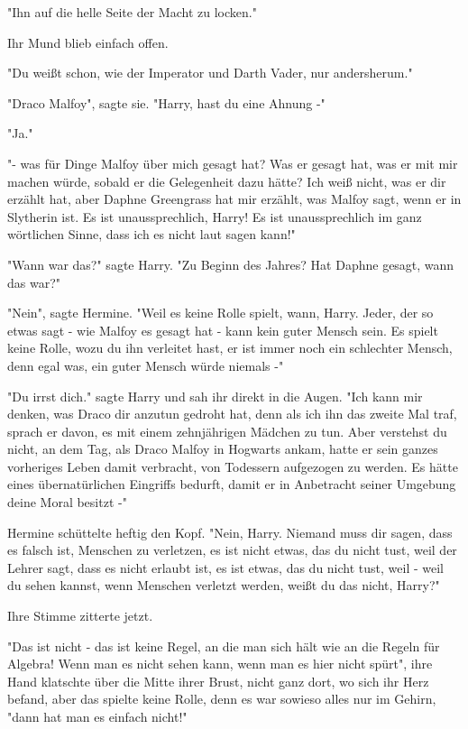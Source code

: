 {"Ihn auf die helle Seite der Macht zu locken."

Ihr Mund blieb einfach offen.

"Du weißt schon, wie der Imperator und Darth Vader, nur andersherum."

"Draco Malfoy", sagte sie. "Harry, hast du eine Ahnung -"

"Ja."

"- was für Dinge Malfoy über mich gesagt hat? Was er gesagt hat, was er mit mir machen würde, sobald er die Gelegenheit dazu hätte? Ich weiß nicht, was er dir erzählt hat, aber Daphne Greengrass hat mir erzählt, was Malfoy sagt, wenn er in Slytherin ist. Es ist unaussprechlich, Harry! Es ist unaussprechlich im ganz wörtlichen Sinne, dass ich es nicht laut sagen kann!"

"Wann war das?" sagte Harry. "Zu Beginn des Jahres? Hat Daphne gesagt, wann das war?"

"Nein", sagte Hermine. "Weil es keine Rolle spielt, wann, Harry. Jeder, der so etwas sagt - wie Malfoy es gesagt hat - kann kein guter Mensch sein. Es spielt keine Rolle, wozu du ihn verleitet hast, er ist immer noch ein schlechter Mensch, denn egal was, ein guter Mensch würde niemals -"

"Du irrst dich." sagte Harry und sah ihr direkt in die Augen. "Ich kann mir denken, was Draco dir anzutun gedroht hat, denn als ich ihn das zweite Mal traf, sprach er davon, es mit einem zehnjährigen Mädchen zu tun. Aber verstehst du nicht, an dem Tag, als Draco Malfoy in Hogwarts ankam, hatte er sein ganzes vorheriges Leben damit verbracht, von Todessern aufgezogen zu werden. Es hätte eines übernatürlichen Eingriffs bedurft, damit er in Anbetracht seiner Umgebung deine Moral besitzt -"

Hermine schüttelte heftig den Kopf. "Nein, Harry. Niemand muss dir sagen, dass es falsch ist, Menschen zu verletzen, es ist nicht etwas, das du nicht tust, weil der Lehrer sagt, dass es nicht erlaubt ist, es ist etwas, das du nicht tust, weil - weil du sehen kannst, wenn Menschen verletzt werden, weißt du das nicht, Harry?"

Ihre Stimme zitterte jetzt.

"Das ist nicht - das ist keine Regel, an die man sich hält wie an die Regeln für Algebra! Wenn man es nicht sehen kann, wenn man es hier nicht spürt", ihre Hand klatschte über die Mitte ihrer Brust, nicht ganz dort, wo sich ihr Herz befand, aber das spielte keine Rolle, denn es war sowieso alles nur im Gehirn, "dann hat man es einfach nicht!"

}
